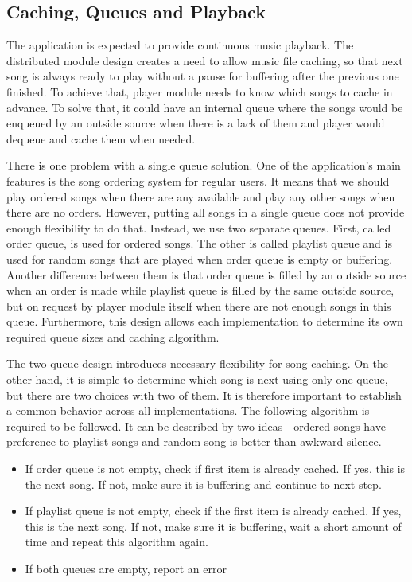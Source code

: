 \subsection{Caching, Queues and Playback}

The application is expected to provide continuous music playback. The distributed module design creates a need to allow music file caching, so that next song is always ready to play without a pause for buffering after the previous one finished. To achieve that, player module needs to know which songs to cache in advance. To solve that, it could have an internal queue where the songs would be enqueued by an outside source when there is a lack of them and player would dequeue and cache them when needed.
\par
There is one problem with a single queue solution. One of the application's main features is the song ordering system for regular users. It means that we should play ordered songs when there are any available and play any other songs when there are no orders. However, putting all songs in a single queue does not provide enough flexibility to do that. Instead, we use two separate queues. First, called order queue, is used for ordered songs. The other is called playlist queue and is used for random songs that are played when order queue is empty or buffering. Another difference between them is that order queue is filled by an outside source when an order is made while playlist queue is filled by the same outside source, but on request by player module itself when there are not enough songs in this queue. Furthermore, this design allows each implementation to determine its own required queue sizes and caching algorithm.
\par
The two queue design introduces necessary flexibility for song caching. On the other hand, it is simple to determine which song is next using only one queue, but there are two choices with two of them. It is therefore important to establish a common behavior across all implementations. The following algorithm is required to be followed. It can be described by two ideas - ordered songs have preference to playlist songs and random song is better than awkward silence.

\begin{itemize}
    \item If order queue is not empty, check if first item is already cached. If yes, this is the next song. If not, make sure it is buffering and continue to next step.
    \item If playlist queue is not empty, check if the first item is already cached. If yes, this is the next song. If not, make sure it is buffering, wait a short amount of time and repeat this algorithm again.
    \item If both queues are empty, report an error
\end{itemize}

